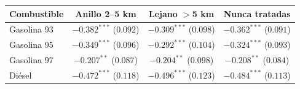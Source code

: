 \begin{tabular}{lccc}
\toprule
Combustible & Anillo 2--5 km & Lejano $>$5 km & Nunca tratadas \\
\midrule
Gasolina 93 & $-0.382^{***}$ ($0.092$) & $-0.309^{***}$ ($0.098$) & $-0.362^{***}$ ($0.091$) \\
Gasolina 95 & $-0.349^{***}$ ($0.096$) & $-0.292^{***}$ ($0.104$) & $-0.324^{***}$ ($0.093$) \\
Gasolina 97 & $-0.207^{**}$ ($0.087$) & $-0.204^{**}$ ($0.098$) & $-0.208^{**}$ ($0.084$) \\
Diésel & $-0.472^{***}$ ($0.118$) & $-0.496^{***}$ ($0.123$) & $-0.484^{***}$ ($0.113$) \\
\bottomrule
\end{tabular}
